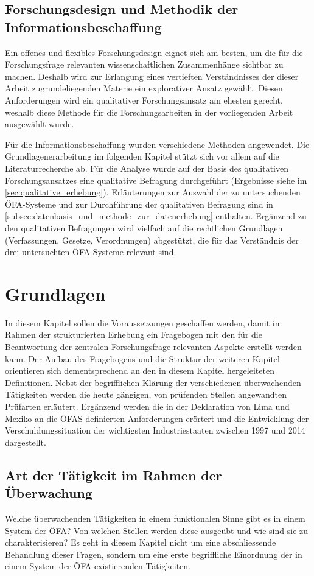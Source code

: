 \documentclass[10pt]{article}
\begin{document}
\subsection{Forschungsdesign und Methodik der Informationsbeschaffung}\label{subsec:forschungsdesign_und_methodik_der_informationsbeschaffung}
Ein offenes und flexibles Forschungsdesign eignet sich am besten, um die für die Forschungsfrage relevanten wissenschaftlichen Zusammenhänge sichtbar zu machen. Deshalb wird zur Erlangung eines vertieften Verständnisses der dieser Arbeit zugrundeliegenden Materie ein explorativer Ansatz gewählt. Diesen Anforderungen wird ein qualitativer Forschungsansatz am ehesten gerecht, weshalb diese Methode für die Forschungsarbeiten in der vorliegenden Arbeit ausgewählt wurde.

Für die Informationsbeschaffung wurden verschiedene Methoden angewendet. Die Grundlagenerarbeitung im folgenden Kapitel stützt sich vor allem auf die Literaturrecherche ab. Für die Analyse wurde auf der Basis des qualitativen Forschungsansatzes eine qualitative Befragung durchgeführt (Ergebnisse siehe im \vref{sec:qualitative_erhebung}). Erläuterungen zur Auswahl der zu untersuchenden ÖFA-Systeme und zur Durchführung der qualitativen Befragung sind in \vref{subsec:datenbasis_und_methode_zur_datenerhebung} enthalten. Ergänzend zu den qualitativen Befragungen wird vielfach auf die rechtlichen Grundlagen (Verfassungen, Gesetze, Verordnungen) abgestützt, die für das Verständnis der drei untersuchten ÖFA-Systeme relevant sind.

\newpage
\section{Grundlagen}\label{sec:grundlagen}
In diesem Kapitel sollen die Voraussetzungen geschaffen werden, damit im Rahmen der strukturierten Erhebung ein Fragebogen mit den für die Beantwortung der zentralen Forschungsfrage relevanten Aspekte erstellt werden kann. Der Aufbau des Fragebogens und die Struktur der weiteren Kapitel orientieren sich dementsprechend an den in diesem Kapitel hergeleiteten Definitionen. Nebst der begrifflichen Klärung der verschiedenen überwachenden Tätigkeiten werden die heute gängigen, von prüfenden Stellen angewandten Prüfarten erläutert. Ergänzend werden die in der Deklaration von Lima und Mexiko an die ÖFAS definierten Anforderungen erörtert und die Entwicklung der Verschuldungssituation der wichtigsten Industriestaaten zwischen 1997 und 2014 dargestellt.

\subsection{Art der Tätigkeit im Rahmen der Überwachung}\label{subsec:art_der_taetigkeit_im_rahmen_der_uberwachung}
Welche überwachenden Tätigkeiten in einem funktionalen Sinne gibt es in einem System der ÖFA? Von welchen Stellen werden diese ausgeübt und wie sind sie zu charakterisieren? Es geht in diesem Kapitel nicht um eine abschliessende Behandlung dieser Fragen, sondern um eine erste begriffliche Einordnung der in einem System der ÖFA existierenden Tätigkeiten.
\end{document}
